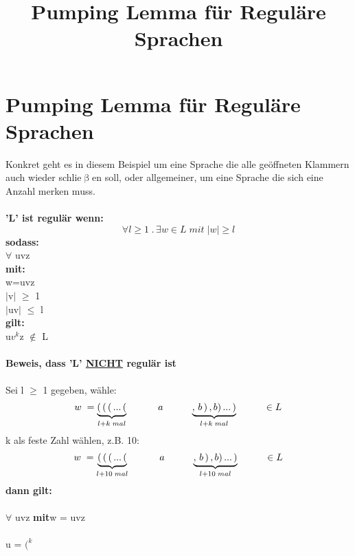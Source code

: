 \documentclass{article}
\title{Pumping Lemma f\"ur Regul\"are Sprachen}
\date{ }
\newcommand{\xhspace}[0]{\noindent\hspace*{5mm}}
\begin{document}
	\section*{Pumping Lemma f\"ur Regul\"are Sprachen}
	Konkret geht es in diesem Beispiel um eine Sprache die alle ge\"offneten Klammern auch wieder schlie$\upbeta$en soll, oder allgemeiner, um eine Sprache die sich eine Anzahl merken muss.\\\\	
	\textbf{'L' ist regul\"ar wenn:}
		\[		
			\forall l \geq 1\;.\, \exists w \in L\;mit\; |w|\geq l
		\]
	\textbf{sodass:}\\
		\xhspace	$\forall$ uvz \\
	\textbf{mit:}\\ 
		\xhspace	w=uvz\\
		\xhspace	$|$v$|$ $\geq$ 1\\
		\xhspace	$|$uv$|$ $\leq$ l\\
	\textbf{gilt:}\\
		\xhspace	u$v^{k}$z $\notin$ L \\ \\
	\textbf{Beweis, dass 'L' \underline{NICHT} regul\"ar ist}\\\\
		Sei l $\geq$ 1 gegeben, w\"ahle:
		\[ 
			w\;= 
				\underbrace{(\,(\,(\,...\,(}_{l+k\;mal}
				\hspace{10mm}
				\;a
				\hspace{1cm}
				\underbrace{,\,b\,)\,,b)\,...\,)}_{l+k\;mal}
				\hspace{10mm}
				\in L
		\]
		k als feste Zahl w\"ahlen, z.B. 10:
		\[ 
			w\;= 
				\underbrace{(\,(\,(\,...\,(}_{l+10\;mal}
				\hspace{10mm}
				\;a
				\hspace{1cm}
				\underbrace{,\,b\,)\,,b)\,...\,)}_{l+10\;mal}
				\hspace{10mm}
				\in L
		\]
		\textbf{dann gilt:}\\\\
		\noindent \hspace*{1cm}$\forall$ uvz \hspace{5mm}\textbf{mit}\hspace{5mm}w = uvz
		\\\\
		\noindent \hspace*{1cm}u = $(^k$ \\ \\
\end{document}
